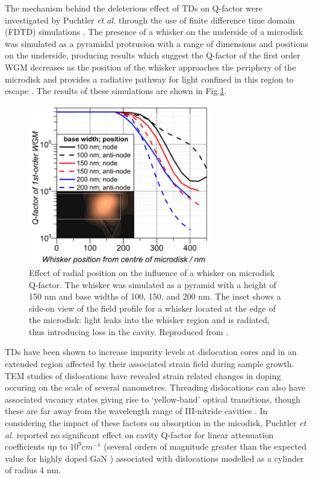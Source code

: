 The mechanism behind the deleterious effect of TDs on Q-factor were investigated by Puchtler \textit{et al.} through the use of finite difference time domain (FDTD) simulations \cite{Puchtler2015}. The presence of a whisker on the underside of a microdisk was simulated as a pyramidal protrusion with a range of dimensions and positions on the underside, producing results which suggest the Q-factor of the first order WGM decreases as the position of the whisker approaches the periphery of the microdisk and provides a radiative pathway for light confined in this region to escape \cite{Puchtler2015}. The results of these simulations are shown in Fig.\ref{puchtlersim}.
\begin{figure}[h]
	\centering
	\includegraphics[width=0.7\textwidth]{Figs/Ch4/puchtlersim}
	\caption {Effect of radial position on the influence of a whisker on microdisk Q-factor. The whisker was simulated as a pyramid with a height of 150 nm and base widths of 100, 150, and 200 nm. The inset shows a side-on view of the field profile for a whisker located at the edge of the microdisk: light leaks into the whisker region and is radiated, thus introducing loss in the cavity. Reproduced from \cite{Puchtler2015}.}
	\label{puchtlersim}
\end{figure}
\FloatBarrier 

TDs have been shown to increase impurity levels at dislocation cores and in an extended region affected by their associated strain field during sample growth. TEM studies of dislocations have revealed strain related changes in doping occuring on the scale of several nanometres\cite{Rhode2013,Horton2015}. Threading dislocations can also have associated vacancy states giving rise to ‘yellow-band’ optical transitions, though these are far away from the wavelength range of III-nitride cavities \cite{Xin2000,Elsner1997}. In considering the impact of these factors  on absorption in the micodisk, Puchtler \textit{et al.} reported no significant effect on cavity Q-factor for linear attenuation coefficients up to $10^{9} cm^{-1}$ (several orders of magnitude greater than the expected value for highly doped GaN \cite{Ambacher1996}) associated with dislocations modelled as a cylinder of radius 4 nm.

